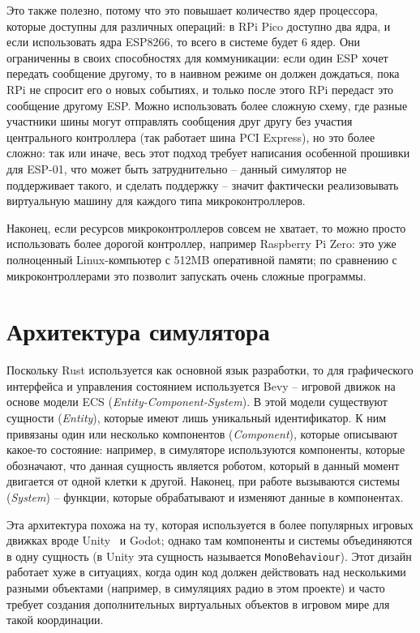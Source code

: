 \documentclass[%
]{report}
\begin{document}
Это также полезно, потому что это повышает количество ядер процессора,
которые доступны для различных операций:
в RPi Pico доступно два ядра,
и если использовать ядра ESP8266,
то всего в системе будет 6 ядер.
Они ограниченны в своих способностях для коммуникации:
если один ESP хочет передать сообщение другому,
то в наивном режиме он должен дождаться,
пока RPi не спросит его о новых событиях,
и только после этого RPi передаст это сообщение другому ESP.
Можно использовать более сложную схему, 
где разные участники шины могут отправлять сообщения друг другу
без участия центрального контроллера
(так работает шина PCI Express),
но это более сложно:
так или иначе, весь этот подход требует написания особенной прошивки
для ESP-01,
что может быть затруднительно --
данный симулятор не поддерживает такого,
и сделать поддержку -- значит фактически реализовывать виртуальную машину
для каждого типа микроконтроллеров.

Наконец, если ресурсов микроконтроллеров совсем не хватает,
то можно просто  использовать более дорогой контроллер,
например Raspberry Pi Zero:
это уже полноценный Linux-компьютер с 512MB оперативной памяти;
по сравнению с микроконтроллерами это позволит запускать
очень сложные программы.

\section{Архитектура симулятора}

Поскольку Rust используется как основной язык разработки,
то для графического интерфейса и управления состоянием используется Bevy -- игровой движок на основе модели ECS
(\emph{Entity-Component-System}).
В этой модели существуют сущности (\emph{Entity}),
которые имеют лишь уникальный идентификатор.
К ним привязаны один или несколько компонентов
(\emph{Component}), которые описывают какое-то состояние:
например, в симуляторе используются компоненты,
которые обозначают, что данная сущность является роботом,
который в данный момент двигается от одной клетки к другой.
Наконец, при работе вызываются системы (\emph{System}) --
функции, которые обрабатывают и изменяют данные
в компонентах.

Эта архитектура похожа на ту, которая используется в более популярных
игровых движках вроде Unity~\cite{unity} и Godot;
однако там компоненты и системы
объединяются в одну сущность
(в Unity эта сущность называется \texttt{MonoBehaviour}).
Этот дизайн работает хуже в ситуациях,
когда один код должен действовать над несколькими разными объектами
(например, в симуляциях радио в этом проекте)
и часто требует создания дополнительных виртуальных объектов в игровом мире
для такой координации.
\end{document}
